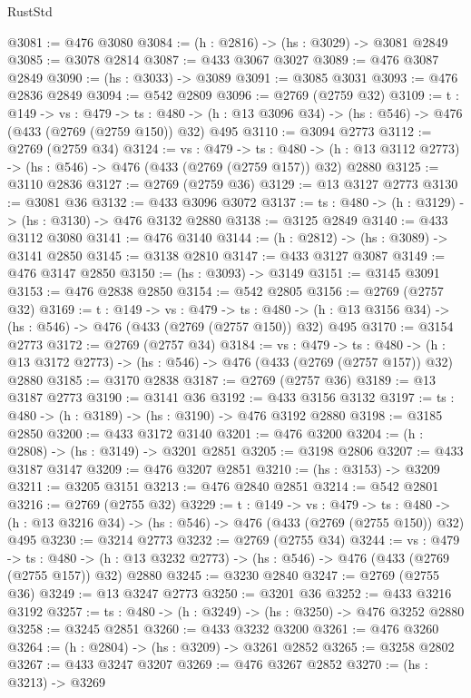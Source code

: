 \begin{lexlean}{RustStd}
\begin{coremodule}
@3081 := @476 @3080
@3084 := (h : @2816) -> (hs : @3029) -> @3081 @2849
@3085 := @3078 @2814
@3087 := @433 @3067 @3027
@3089 := @476 @3087 @2849
@3090 := (hs : @3033) -> @3089
@3091 := @3085 @3031
@3093 := @476 @2836 @2849
@3094 := @542 @2809
@3096 := @2769 (@2759 @32)
@3109 := {t : @149} ->
  {vs : @479} ->
  {ts : @480} -> (h : @13 @3096 @34) -> (hs : @546) -> @476 (@433 (@2769 (@2759 @150)) @32) @495
@3110 := @3094 @2773
@3112 := @2769 (@2759 @34)
@3124 := {vs : @479} ->
  {ts : @480} -> (h : @13 @3112 @2773) -> (hs : @546) -> @476 (@433 (@2769 (@2759 @157)) @32) @2880
@3125 := @3110 @2836
@3127 := @2769 (@2759 @36)
@3129 := @13 @3127 @2773
@3130 := @3081 @36
@3132 := @433 @3096 @3072
@3137 := {ts : @480} -> (h : @3129) -> (hs : @3130) -> @476 @3132 @2880
@3138 := @3125 @2849
@3140 := @433 @3112 @3080
@3141 := @476 @3140
@3144 := (h : @2812) -> (hs : @3089) -> @3141 @2850
@3145 := @3138 @2810
@3147 := @433 @3127 @3087
@3149 := @476 @3147 @2850
@3150 := (hs : @3093) -> @3149
@3151 := @3145 @3091
@3153 := @476 @2838 @2850
@3154 := @542 @2805
@3156 := @2769 (@2757 @32)
@3169 := {t : @149} ->
  {vs : @479} ->
  {ts : @480} -> (h : @13 @3156 @34) -> (hs : @546) -> @476 (@433 (@2769 (@2757 @150)) @32) @495
@3170 := @3154 @2773
@3172 := @2769 (@2757 @34)
@3184 := {vs : @479} ->
  {ts : @480} -> (h : @13 @3172 @2773) -> (hs : @546) -> @476 (@433 (@2769 (@2757 @157)) @32) @2880
@3185 := @3170 @2838
@3187 := @2769 (@2757 @36)
@3189 := @13 @3187 @2773
@3190 := @3141 @36
@3192 := @433 @3156 @3132
@3197 := {ts : @480} -> (h : @3189) -> (hs : @3190) -> @476 @3192 @2880
@3198 := @3185 @2850
@3200 := @433 @3172 @3140
@3201 := @476 @3200
@3204 := (h : @2808) -> (hs : @3149) -> @3201 @2851
@3205 := @3198 @2806
@3207 := @433 @3187 @3147
@3209 := @476 @3207 @2851
@3210 := (hs : @3153) -> @3209
@3211 := @3205 @3151
@3213 := @476 @2840 @2851
@3214 := @542 @2801
@3216 := @2769 (@2755 @32)
@3229 := {t : @149} ->
  {vs : @479} ->
  {ts : @480} -> (h : @13 @3216 @34) -> (hs : @546) -> @476 (@433 (@2769 (@2755 @150)) @32) @495
@3230 := @3214 @2773
@3232 := @2769 (@2755 @34)
@3244 := {vs : @479} ->
  {ts : @480} -> (h : @13 @3232 @2773) -> (hs : @546) -> @476 (@433 (@2769 (@2755 @157)) @32) @2880
@3245 := @3230 @2840
@3247 := @2769 (@2755 @36)
@3249 := @13 @3247 @2773
@3250 := @3201 @36
@3252 := @433 @3216 @3192
@3257 := {ts : @480} -> (h : @3249) -> (hs : @3250) -> @476 @3252 @2880
@3258 := @3245 @2851
@3260 := @433 @3232 @3200
@3261 := @476 @3260
@3264 := (h : @2804) -> (hs : @3209) -> @3261 @2852
@3265 := @3258 @2802
@3267 := @433 @3247 @3207
@3269 := @476 @3267 @2852
@3270 := (hs : @3213) -> @3269

\end{coremodule}
\end{lexlean}
